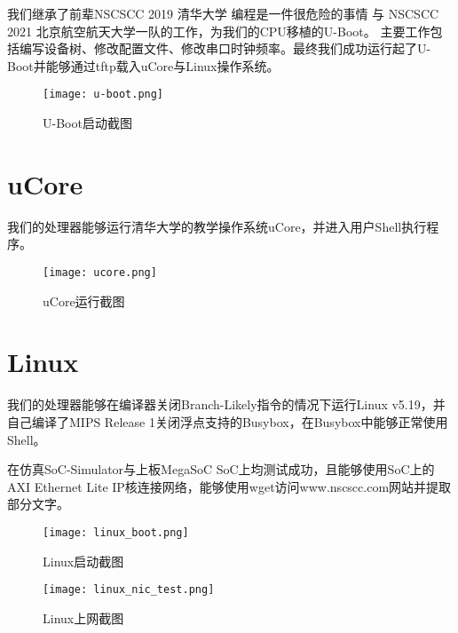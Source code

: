 我们继承了前辈NSCSCC 2019 清华大学 编程是一件很危险的事情 与 NSCSCC 2021 北京航空航天大学一队的工作，为我们的CPU移植的U-Boot。
主要工作包括编写设备树、修改配置文件、修改串口时钟频率。最终我们成功运行起了U-Boot并能够通过tftp载入uCore与Linux操作系统。

\begin{figure}[h]
    \centering
    \texttt{[image: u-boot.png]}
    \caption{U-Boot启动截图}
\end{figure}

\newpage

\section{uCore}

我们的处理器能够运行清华大学的教学操作系统uCore，并进入用户Shell执行程序。

\begin{figure}[htpb]
    \centering
    \texttt{[image: ucore.png]}
    \caption{uCore运行截图}
    \label{img:ucore}
\end{figure}

\newpage

\section{Linux}

我们的处理器能够在编译器关闭Branch-Likely指令的情况下运行Linux v5.19，并自己编译了MIPS Release 1关闭浮点支持的Busybox，在Busybox中能够正常使用Shell。

在仿真SoC-Simulator与上板MegaSoC SoC上均测试成功，且能够使用SoC上的AXI Ethernet Lite IP核连接网络，能够使用wget访问www.nscscc.com网站并提取部分文字。

\begin{figure}[h]
    \centering
    \texttt{[image: linux\_boot.png]}
    \caption{Linux启动截图}
    \label{img:linux_boot}
\end{figure}

\begin{figure}[h]
    \centering
    \texttt{[image: linux\_nic\_test.png]}
    \caption{Linux上网截图}
    \label{img:linux_nic_test}
\end{figure}